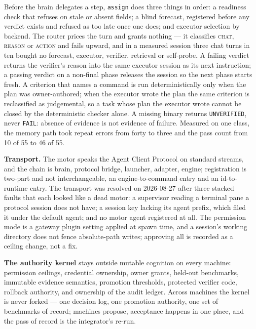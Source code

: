 Before the brain delegates a step, \texttt{assign} does three things in order: a readiness check that refuses on stale or absent fields; a blind forecast, registered before any verdict exists and refused as too late once one does; and executor selection by backend. The router prices the turn and grants nothing --- it classifies \textsc{chat}, \textsc{reason} or \textsc{action} and fails upward, and in a measured session three chat turns in ten bought no forecast, executor, verifier, retrieval or self-probe. A failing verdict returns the verifier's reason into the same executor session as its next instruction; a passing verdict on a non-final phase releases the session so the next phase starts fresh. A criterion that names a command is run deterministically only when the plan was owner-authored; when the executor wrote the plan the same criterion is reclassified as judgemental, so a task whose plan the executor wrote cannot be closed by the deterministic checker alone. A missing binary returns \texttt{UNVERIFIED}, never \texttt{FAIL}: absence of evidence is not evidence of failure. Measured on one class, the memory path took repeat errors from forty to three and the pass count from 10 of 55 to 46 of 55.

\textbf{Transport.} The motor speaks the Agent Client Protocol on standard streams, and the chain is brain, protocol bridge, launcher, adapter, engine; registration is two-part and not interchangeable, an engine-to-command entry and an id-to-runtime entry. The transport was resolved on 2026-08-27 after three stacked faults that each looked like a dead motor: a supervisor reading a terminal pane a protocol session does not have; a session key lacking its agent prefix, which filed it under the default agent; and no motor agent registered at all. The permission mode is a gateway plugin setting applied at spawn time, and a session's working directory does not fence absolute-path writes; approving all is recorded as a ceiling change, not a fix.

\textbf{The authority kernel} stays outside mutable cognition on every machine: permission ceilings, credential ownership, owner grants, held-out benchmarks, immutable evidence semantics, promotion thresholds, protected verifier code, rollback authority, and ownership of the audit ledger. Across machines the kernel is never forked --- one decision log, one promotion authority, one set of benchmarks of record; machines propose, acceptance happens in one place, and the pass of record is the integrator's re-run.

